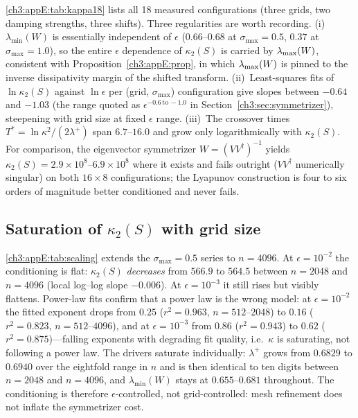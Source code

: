\ref{ch3:appE:tab:kappa18} lists all 18 measured configurations
(three grids, two damping strengths, three shifts).  Three regularities
are worth recording.  (i)~$\lambda_{\min}(W)$ is essentially
independent of $\epsilon$ ($0.66$--$0.68$ at $\sigma_{\max}=0.5$,
$0.37$ at $\sigma_{\max}=1.0$), so the entire $\epsilon$ dependence of
$\kappa_2(S)$ is carried by $\lambda_{\max}(W)$, consistent with
Proposition~\ref{ch3:appE:prop}, in which $\lambda_{\max}(W)$ is pinned to the
inverse dissipativity margin of the shifted transform.
(ii)~Least-squares fits of $\ln\kappa_2(S)$ against $\ln\epsilon$ per
(grid, $\sigma_{\max}$) configuration give slopes between $-0.64$ and
$-1.03$ (the range quoted as
$\epsilon^{-0.6\,\text{to}\,-1.0}$ in Section~\ref{ch3:sec:symmetrizer}),
steepening with grid size at fixed $\epsilon$ range.  (iii)~The
crossover times $T^{*}=\ln\kappa^{2}/(2\lambda^{+})$ span
$6.7$--$16.0$ and grow only logarithmically with $\kappa_2(S)$.  For
comparison, the eigenvector symmetrizer $W=(VV^{\dagger})^{-1}$
yields $\kappa_2(S)=2.9\times10^{8}$--$6.9\times10^{8}$ where it
exists and fails outright ($VV^{\dagger}$ numerically singular) on
both $16\times8$ configurations; the Lyapunov construction is four to
six orders of magnitude better conditioned and never fails.

\subsection{Saturation of \texorpdfstring{$\kappa_2(S)$}{kappa2(S)}
with grid size}
\label{ch3:appE:saturation}

\ref{ch3:appE:tab:scaling} extends the $\sigma_{\max}=0.5$ series to
$n=4096$.  At $\epsilon=10^{-2}$ the conditioning is flat:
$\kappa_2(S)$ \emph{decreases} from $566.9$ to $564.5$ between
$n=2048$ and $n=4096$ (local log--log slope $-0.006$).  At
$\epsilon=10^{-3}$ it still rises but visibly flattens.  Power-law
fits confirm that a power law is the wrong model: at
$\epsilon=10^{-2}$ the fitted exponent drops from $0.25$
($r^{2}=0.963$, $n=512$--$2048$) to $0.16$ ($r^{2}=0.823$,
$n=512$--$4096$), and at $\epsilon=10^{-3}$ from $0.86$
($r^{2}=0.943$) to $0.62$ ($r^{2}=0.875$)---falling exponents with
degrading fit quality, i.e.\ $\kappa$ is saturating, not following a
power law.  The drivers saturate individually: $\lambda^{+}$ grows
from $0.6829$ to $0.6940$ over the eightfold range in $n$ and is then
identical to ten digits between $n=2048$ and $n=4096$, and
$\lambda_{\min}(W)$ stays at $0.655$--$0.681$ throughout.  The
conditioning is therefore $\epsilon$-controlled, not grid-controlled:
mesh refinement does not inflate the symmetrizer cost.

